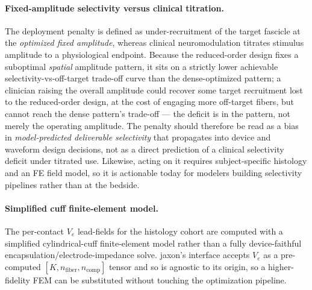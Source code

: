 \paragraph{Fixed-amplitude selectivity versus clinical titration.}
The deployment penalty is defined as under-recruitment of the target
fascicle at the \emph{optimized fixed amplitude}, whereas clinical
neuromodulation titrates stimulus amplitude to a physiological
endpoint.  Because the reduced-order design fixes a suboptimal
\emph{spatial} amplitude pattern, it sits on a strictly lower achievable
selectivity-vs-off-target trade-off curve than the dense-optimized
pattern; a clinician raising the overall amplitude could recover some
target recruitment lost to the reduced-order design, at the cost of
engaging more off-target fibers, but cannot reach the dense pattern's
trade-off --- the deficit is in the pattern, not merely the operating
amplitude.  The penalty should
therefore be read as a bias in \emph{model-predicted deliverable
selectivity} that propagates into device and waveform design decisions,
not as a direct prediction of a clinical selectivity deficit under
titrated use.  Likewise, acting on it requires subject-specific
histology and an FE field model, so it is actionable today for
modelers building selectivity pipelines rather than at the bedside.

\paragraph{Simplified cuff finite-element model.}
The per-contact $V_e$ lead-fields for the histology cohort are computed
with a simplified cylindrical-cuff finite-element model rather than a
fully device-faithful encapsulation/electrode-impedance solve.  jaxon's
interface accepts $V_e$ as a pre-computed
$[K, n_{\mathrm{fiber}}, n_{\mathrm{comp}}]$ tensor and so is agnostic
to its origin, so a higher-fidelity FEM can be substituted without
touching the optimization pipeline.

